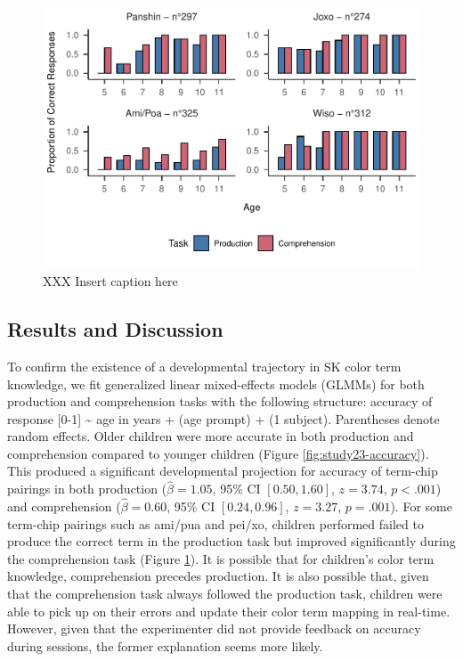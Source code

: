 \documentclass[
  english,
  ,man,floatsintext]{apa6}
\begin{document}
\begin{figure}
\centering
\includegraphics{amazon_color_files/figure-latex/study2-task-compare-plot-1.pdf}
\caption{\label{fig:study2-task-compare-plot}XXX Insert caption here}
\end{figure}

\hypertarget{results-and-discussion-1}{%
\subsection{Results and Discussion}\label{results-and-discussion-1}}

To confirm the existence of a developmental trajectory in SK color term knowledge, we fit generalized linear mixed-effects models (GLMMs) for both production and comprehension tasks with the following structure: accuracy of response {[}0-1{]} \textasciitilde{} age in years + (age \textbar{} prompt) + (1 \textbar{} subject). Parentheses denote random effects. Older children were more accurate in both production and comprehension compared to younger children (Figure \ref{fig:study23-accuracy}). This produced a significant developmental projection for accuracy of term-chip pairings in both production (\(\hat{\beta} = 1.05\), 95\% CI \([0.50, 1.60]\), \(z = 3.74\), \(p < .001\)) and comprehension (\(\hat{\beta} = 0.60\), 95\% CI \([0.24, 0.96]\), \(z = 3.27\), \(p = .001\)). For some term-chip pairings such as ami/pua and pei/xo, children performed failed to produce the correct term in the production task but improved significantly during the comprehension task (Figure \ref{fig:study2-task-compare-plot}). It is possible that for children's color term knowledge, comprehension precedes production. It is also possible that, given that the comprehension task always followed the production task, children were able to pick up on their errors and update their color term mapping in real-time. However, given that the experimenter did not provide feedback on accuracy during sessions, the former explanation seems more likely.
\end{document}
